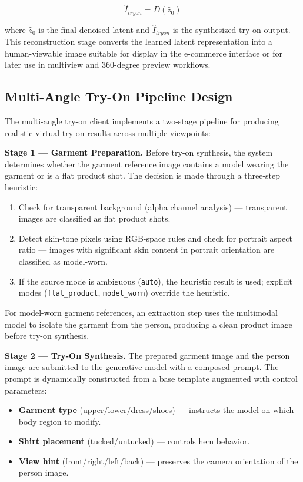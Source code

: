 \begin{equation}
\hat{I}_{tryon} = D(\hat{z}_0)
\end{equation}

where \(\hat{z}_0\) is the final denoised latent and \(\hat{I}_{tryon}\) is the synthesized try-on output. This reconstruction stage converts the learned latent representation into a human-viewable image suitable for display in the e-commerce interface or for later use in multiview and 360-degree preview workflows.

\subsection{Multi-Angle Try-On Pipeline Design}
The multi-angle try-on client implements a two-stage pipeline for producing realistic virtual try-on results across multiple viewpoints:

\textbf{Stage 1 --- Garment Preparation.} Before try-on synthesis, the system determines whether the garment reference image contains a model wearing the garment or is a flat product shot. The decision is made through a three-step heuristic:
\begin{enumerate}[leftmargin=*]
    \item Check for transparent background (alpha channel analysis) --- transparent images are classified as flat product shots.
    \item Detect skin-tone pixels using RGB-space rules and check for portrait aspect ratio --- images with significant skin content in portrait orientation are classified as model-worn.
    \item If the source mode is ambiguous (\texttt{auto}), the heuristic result is used; explicit modes (\texttt{flat\_product}, \texttt{model\_worn}) override the heuristic.
\end{enumerate}

For model-worn garment references, an extraction step uses the multimodal model to isolate the garment from the person, producing a clean product image before try-on synthesis.

\textbf{Stage 2 --- Try-On Synthesis.} The prepared garment image and the person image are submitted to the generative model with a composed prompt. The prompt is dynamically constructed from a base template augmented with control parameters:
\begin{itemize}[leftmargin=*]
    \item \textbf{Garment type} (upper/lower/dress/shoes) --- instructs the model on which body region to modify.
    \item \textbf{Shirt placement} (tucked/untucked) --- controls hem behavior.
    \item \textbf{View hint} (front/right/left/back) --- preserves the camera orientation of the person image.
\end{itemize}

